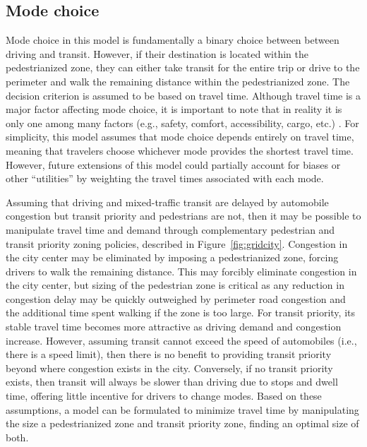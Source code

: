 \documentclass{elsarticle}\usepackage[]{graphicx}\usepackage[]{color}
\begin{document}
\subsection{Mode choice}
Mode choice in this model is fundamentally a binary choice between between driving and transit. However, if their destination is located within the pedestrianized zone, they can either take transit for the entire trip or drive to the perimeter and walk the remaining distance within the pedestrianized zone. The decision criterion is assumed to be based on travel time. Although travel time is a major factor affecting mode choice, it is important to note that in reality it is only one among many factors (e.g., safety, comfort, accessibility, cargo, etc.) \citep{DeGruyter2019,Currie2020}. For simplicity, this model assumes that mode choice depends entirely on travel time, meaning that travelers choose whichever mode provides the shortest travel time. However, future extensions of this model could partially account for biases or other ``utilities'' by weighting the travel times associated with each mode. 

Assuming that driving and mixed-traffic transit are delayed by automobile congestion but transit priority and pedestrians are not, then it may be possible to manipulate travel time and demand through complementary pedestrian and transit priority zoning policies, described in Figure~\ref{fig:gridcity}. Congestion in the city center may be eliminated by imposing a pedestrianized zone, forcing drivers to walk the remaining distance. This may forcibly eliminate congestion in the city center, but sizing of the pedestrian zone is critical as any reduction in congestion delay may be quickly outweighed by perimeter road congestion and the additional time spent walking if the zone is too large. For transit priority, its stable travel time becomes more attractive as driving demand and congestion increase. However, assuming transit cannot exceed the speed of automobiles (i.e., there is a speed limit), then there is no benefit to providing transit priority beyond where congestion exists in the city. Conversely, if no transit priority exists, then transit will always be slower than driving due to stops and dwell time, offering little incentive for drivers to change modes. Based on these assumptions, a model can be formulated to minimize travel time by manipulating the size a pedestrianized zone and transit priority zone, finding an optimal size of both. 
\end{document}
